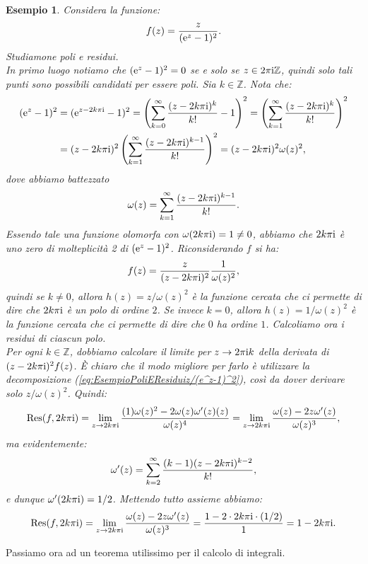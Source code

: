 \documentclass[11pt]{book}
\theoremstyle{Definizione}
\theoremstyle{TeoremaProposizioneLemmaCorollarioCongettura}
\theoremstyle{OsservazioneNotaEsempio}
\newtheorem{myes}{Esempio}[section]
\newcommand{\Z}{\mathbb{Z}}
\renewcommand{\i}{\textup{i}}
\newcommand{\e}{\textup{e}}
\newcommand{\Res}{\textup{Res}}
\begin{document}
\begin{myes}
Considera la funzione:
$$
f(z) = \frac{z}{(\e^{z}-1)^2}.
$$
Studiamone poli e residui.\\ 
In primo luogo notiamo che $(\e^{z}-1)^2 = 0$ se e solo se $z\in 2\pi\i\Z$, quindi solo tali punti sono possibili candidati per essere poli. Sia $k \in \Z$. Nota che:
\begin{align*}
(\e^{z}-1)^2 &= (\e^{z-2k\pi\i} - 1)^2 = \left(\sum_{k = 0}^\infty \frac{(z-2k\pi\i)^k}{k!}-1\right)^2 =\left(\sum_{k = 1}^\infty \frac{(z-2k\pi\i)^k}{k!}\right)^2 \\
&= (z-2k\pi\i)^2\left(\sum_{k = 1}^\infty \frac{(z-2k\pi\i)^{k-1}}{k!}\right)^2 = (z-2k\pi\i)^2 \omega(z)^2,
\end{align*}
dove abbiamo battezzato
$$
\omega(z) = \sum_{k = 1}^\infty \frac{(z-2k\pi\i)^{k-1}}{k!}.
$$
Essendo tale una funzione olomorfa con $\omega(2k\pi\i) = 1\neq 0$, abbiamo che $2k\pi\i$ è uno zero di molteplicità 2 di $(\e^{z}-1)^2$. Riconsiderando $f$ si ha:
\begin{equation}\label{eq:EsempioPoliEResiduiz/(e^z-1)^2}
f(z) = \frac{z}{(z-2k\pi\i)^2}\frac{1}{\omega(z)^2},
\end{equation}
quindi se $k \neq 0$, allora $h(z) = z/\omega(z)^2$ è la funzione cercata che ci permette di dire che $2k\pi\i$ è un polo di ordine $2$. Se invece $k = 0$, allora $h(z) = 1/\omega(z)^2$ è la funzione cercata che ci permette di dire che $0$ ha ordine $1$. Calcoliamo ora i residui di ciascun polo.\\
Per ogni $k\in \Z$, dobbiamo calcolare il limite per $z \to 2\pi\i k$ della derivata di $(z-2k\pi\i)^2 f(z)$. È chiaro che il modo migliore per farlo è utilizzare la decomposizione (\ref{eq:EsempioPoliEResiduiz/(e^z-1)^2}), così da dover derivare solo $z/\omega(z)^2$. Quindi:
$$
\Res(f,2k\pi\i) = \lim_{z \to 2k\pi\i} \frac{(1)\omega(z)^2-2\omega(z)\omega'(z)(z)}{\omega(z)^4} = \lim_{z \to 2k\pi\i} \frac{\omega(z)-2z\omega'(z)}{\omega(z)^3},
$$
ma evidentemente:
$$
\omega'(z) = \sum_{k = 2}^\infty \frac{(k-1)(z-2k\pi\i)^{k-2}}{k!},
$$
e dunque $\omega'(2k\pi\i) = 1/2$. Mettendo tutto assieme abbiamo:
$$
\Res(f,2k\pi\i) = \lim_{z \to 2k\pi\i} \frac{\omega(z)-2z\omega'(z)}{\omega(z)^3} = \frac{1-2 \cdot 2k\pi\i \cdot (1/2)}{1} = 1-2k\pi\i.
$$
\end{myes}
Passiamo ora ad un teorema utilissimo per il calcolo di integrali.
\end{document}
